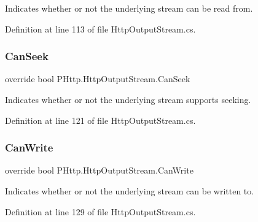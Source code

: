 Indicates whether or not the underlying stream can be read from. 



Definition at line 113 of file Http\+Output\+Stream.\+cs.

\mbox{\label{class_p_http_1_1_http_output_stream_ad098665c35a75ffae7b6a1bd60f5f922}} 
\subsubsection{\texorpdfstring{Can\+Seek}{CanSeek}}
{\footnotesize\ttfamily override bool P\+Http.\+Http\+Output\+Stream.\+Can\+Seek\hspace{0.3cm}{\ttfamily [get]}}



Indicates whether or not the underlying stream supports seeking. 



Definition at line 121 of file Http\+Output\+Stream.\+cs.

\mbox{\label{class_p_http_1_1_http_output_stream_a0ce0f653423645a055daea15d6f726a7}} 
\subsubsection{\texorpdfstring{Can\+Write}{CanWrite}}
{\footnotesize\ttfamily override bool P\+Http.\+Http\+Output\+Stream.\+Can\+Write\hspace{0.3cm}{\ttfamily [get]}}



Indicates whether or not the underlying stream can be written to. 



Definition at line 129 of file Http\+Output\+Stream.\+cs.

\mbox{\label{class_p_http_1_1_http_output_stream_abbc51e3cac2c8e5db155fd82d9c08a7c}} 
